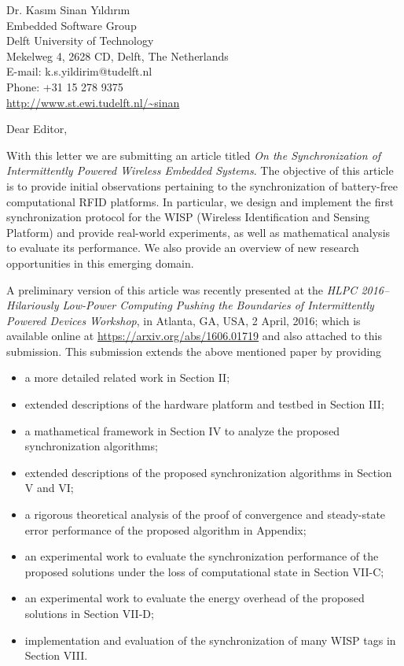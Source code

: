 \documentclass[11pt]{article}
\makeatletter
\def\Who{Dr. Kas{\i}m Sinan Y{\i}ld{\i}r{\i}m}
\def\What{}
\def\Where{Embedded Software Group}
\def\Affiliation{Delft University of Technology}
\def\Address{Mekelweg 4, 2628 CD, Delft, The Netherlands}
\def\Email{E-mail:  k.s.yildirim@tudelft.nl}
\def\Telephone{Phone: +31 15 278 9375}
\def\Webpage{\url{http://www.st.ewi.tudelft.nl/~sinan}}
\def\Sender{
	
	\begin{flushright}
		\Who \What \\
		\Where \\
		\Affiliation \\
		\Address \\
		\Email \\
		\Telephone \\
		\Webpage
	\end{flushright}	
}
\makeatother
\begin{document}
	
	\thispagestyle{empty}
	
	\Sender
	
	\bigskip
	
	
	Dear Editor,
	
	With this letter we are submitting an article titled \emph{On the 
		Synchronization 
		of Intermittently Powered Wireless Embedded Systems}.
	The objective of this article is to provide initial observations pertaining to 
	the synchronization of battery-free computational RFID platforms. In 
	particular, we design and implement the first synchronization protocol for the 
	WISP (Wireless 
	Identification and Sensing Platform) and provide real-world experiments, as 
	well as mathematical analysis to evaluate its performance. We also 
	provide an overview of new 
	research opportunities in this emerging domain.
	
	
	
	A preliminary version of this article was recently presented at the \emph{HLPC 
		2016--Hilariously 
		Low-Power Computing Pushing the Boundaries of Intermittently Powered Devices 
		Workshop}, 
	in Atlanta, GA, USA, 2 April, 2016; which is available online at 
	\href{https://arxiv.org/abs/1606.01719}{https://arxiv.org/abs/1606.01719} and 
	also attached to this submission. This submission extends the above mentioned 
	paper by providing 
	\begin{itemize}
		\item a more detailed related work in Section II;
		\item extended descriptions of the hardware platform and testbed in Section 
		III;
		\item a mathametical framework in Section IV to analyze the proposed 
		synchronization algorithms;
		\item extended descriptions of the proposed synchronization algorithms in 
		Section V and VI;
		\item a rigorous theoretical analysis of the proof of convergence and 
		steady-state error performance of the proposed algorithm in Appendix;
		\item an experimental work to evaluate the synchronization
		performance of the proposed solutions under the loss of computational 
		state in Section VII-C;	
		\item an experimental work to evaluate the energy overhead of the proposed solutions in Section VII-D;	
		\item implementation and evaluation of the synchronization of 
		many WISP tags in Section VIII.
	\end{itemize}
	
\end{document}
